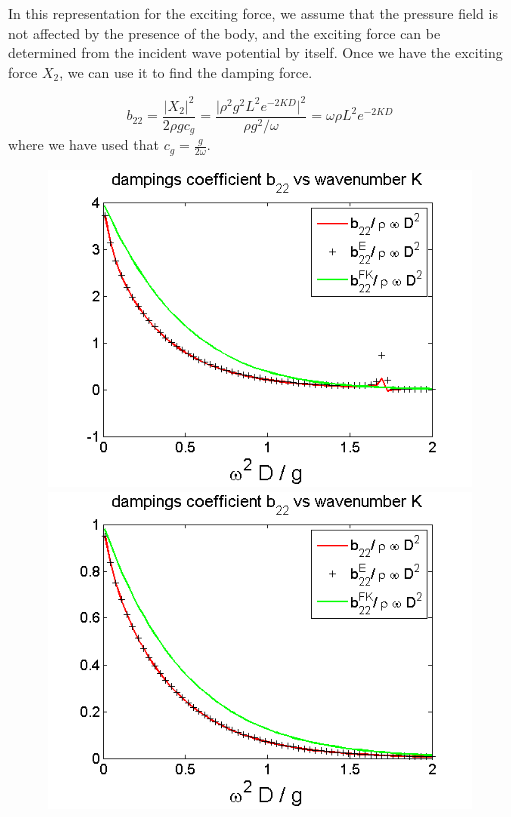 \documentclass[a4paper,10pt]{article}
\begin{document}
In this representation for the exciting force, we assume that the pressure field is not affected by the presence of the body, and the exciting force can be determined from the incident wave potential by itself. Once we have the exciting force $X_2$, we can use it to find the damping force.

\begin{equation}
b_{22} = \frac{\vert X_2 \vert^2}{2 \rho g c_g} = \frac{\big\vert \rho^2 g^2 L^2 e^{-2 KD} \big\vert^2}{\rho g^2 / \omega} = \omega \rho L^2 e^{-2 KD}
\end{equation}
where we have used that $c_g = \frac{g}{2 \omega}$.\\[1 em]

\begin{figure}[H]
  \includegraphics[width=\linewidth]{ad_mass_box1_2.png}
  \caption{}\label{add_mass_box1_2}
\endminipage
{}
  \includegraphics[width=\linewidth]{ad_mass_box2_2.png}

\end{figure}
\end{document}
